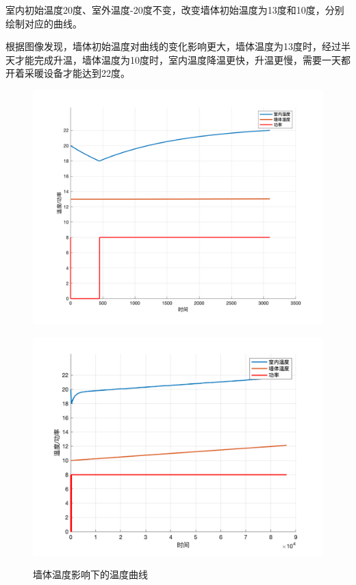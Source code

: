 \documentclass[withoutpreface,bwprint]{cumcmthesis} %
\begin{document}
室内初始温度20度、室外温度-20度不变，改变墙体初始温度为13度和10度，分别绘制对应的曲线。

根据图像发现，墙体初始温度对曲线的变化影响更大，墙体温度为13度时，经过半天才能完成升温，墙体温度为10度时，室内温度降温更快，升温更慢，需要一天都开着采暖设备才能达到22度。
\begin{figure}[h]
    \centering
    \begin{minipage}[c]{0.45\textwidth}
        \includegraphics[width=1\textwidth]{figures/1-1-4.png}
    \label{fig:my_label}
    \end{minipage}
\begin{minipage}[c]{0.45\textwidth}
    \includegraphics[width=1\textwidth]{figures/1-1-5.png}
    \label{fig:my_label}
\end{minipage}
\caption{墙体温度影响下的温度曲线}
\end{figure}
\end{document}
